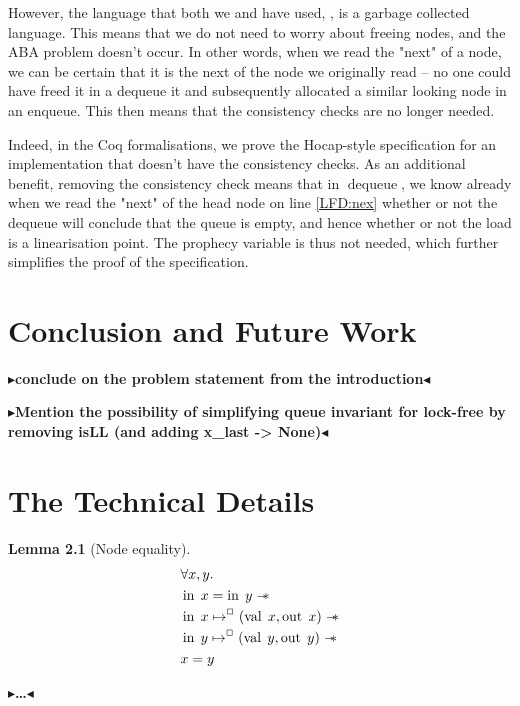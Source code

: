 \documentclass[a4paper, 11pt]{report}
\newtheorem{lemma}[theorem]{Lemma}
\newtheorem{definition}{Definition}[section]
\newcommand{\dequeue}{\operatorname{dequeue}}
\newcommand{\tlmsq}{Two-Lock M\&S-Queue\xspace}
\newcommand{\nIn}[1]{\operatorname{in} \; #1}
\newcommand{\nVal}[1]{\operatorname{val} \; #1}
\newcommand{\nOut}[1]{\operatorname{out} \; #1}
\newcommand{\isNode}[1]{\nIn{#1} \mapsto^{\persistently} (\nVal{#1}, \nOut{#1})}
\newcommand{\todo}[1]{{\color[rgb]{.5,0,0}\textbf{$\blacktriangleright$#1$\blacktriangleleft$}}}
\begin{document}
However, the language that both we and \cite{DBLP:conf/cpp/VindumB21} have used, \heaplang, is a garbage collected language. This means that we do not need to worry about freeing nodes, and the ABA problem doesn't occur. In other words, when we read the "next" of a node, we can be certain that it is the next of the node we originally read -- no one could have freed it in a dequeue it and subsequently allocated a similar looking node in an enqueue. This then means that the consistency checks are no longer needed. 

Indeed, in the Coq formalisations, we prove the Hocap-style specification for an implementation that doesn't have the consistency checks. As an additional benefit, removing the consistency check means that in $\dequeue$, we know already when we read the "next" of the head node on line \ref{LFD:nex} whether or not the dequeue will conclude that the queue is empty, and hence whether or not the load is a linearisation point. The prophecy variable is thus not needed, which further simplifies the proof of the specification.


\chapter{Conclusion and Future Work}
\label{ch:conclusion_fw}

\todo{conclude on the problem statement from the introduction}

\todo{Mention the possibility of simplifying queue invariant for lock-free by removing isLL (and adding x\_last -> None)}


\cleardoublepage
{}




\cleardoublepage
\appendix
\chapter{The Technical Details}

\begin{lemma}[Node equality]\label{lemma:nIn-equal}
  \begin{align*}
    &\All x, y.\\
    &\nIn{x} = \nIn{y} \wand\\
    &\isNode{x} \wand\\
    &\isNode{y} \wand\\
    &x = y
  \end{align*}
\end{lemma}


\todo{\dots}
\end{document}
